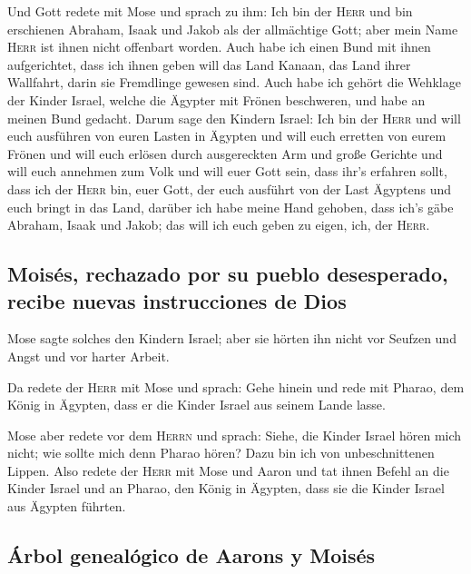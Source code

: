  Und Gott redete mit Mose und sprach zu ihm: Ich bin der
\textsc{Herr}  und bin erschienen Abraham, Isaak und Jakob
als der allmächtige Gott; aber mein Name \textsc{Herr} ist ihnen nicht
offenbart worden.  Auch habe ich einen Bund mit ihnen
aufgerichtet, dass ich ihnen geben will das Land Kanaan, das Land ihrer
Wallfahrt, darin sie Fremdlinge gewesen sind.  Auch habe
ich gehört die Wehklage der Kinder Israel, welche die Ägypter mit Frönen
beschweren, und habe an meinen Bund gedacht.  Darum sage
den Kindern Israel: Ich bin der \textsc{Herr} und will euch ausführen
von euren Lasten in Ägypten und will euch erretten von eurem Frönen und
will euch erlösen durch ausgereckten Arm und große Gerichte
 und will euch annehmen zum Volk und will euer Gott sein,
dass ihr's erfahren sollt, dass ich der \textsc{Herr} bin, euer Gott,
der euch ausführt von der Last Ägyptens  und euch bringt
in das Land, darüber ich habe meine Hand gehoben, dass ich's gäbe
Abraham, Isaak und Jakob; das will ich euch geben zu eigen, ich, der
\textsc{Herr}.

\hypertarget{moisuxe9s-rechazado-por-su-pueblo-desesperado-recibe-nuevas-instrucciones-de-dios}{%
\subsection{Moisés, rechazado por su pueblo desesperado, recibe nuevas
instrucciones de
Dios}\label{moisuxe9s-rechazado-por-su-pueblo-desesperado-recibe-nuevas-instrucciones-de-dios}}

 Mose sagte solches den Kindern Israel; aber sie hörten
ihn nicht vor Seufzen und Angst und vor harter Arbeit.

 Da redete der \textsc{Herr} mit Mose und sprach:
 Gehe hinein und rede mit Pharao, dem König in Ägypten,
dass er die Kinder Israel aus seinem Lande lasse.

 Mose aber redete vor dem \textsc{Herrn} und sprach:
Siehe, die Kinder Israel hören mich nicht; wie sollte mich denn Pharao
hören? Dazu bin ich von unbeschnittenen Lippen.  Also
redete der \textsc{Herr} mit Mose und Aaron und tat ihnen Befehl an die
Kinder Israel und an Pharao, den König in Ägypten, dass sie die Kinder
Israel aus Ägypten führten.

\hypertarget{uxe1rbol-genealuxf3gico-de-aarons-y-moisuxe9s}{%
\subsection{Árbol genealógico de Aarons y
Moisés}\label{uxe1rbol-genealuxf3gico-de-aarons-y-moisuxe9s}}

